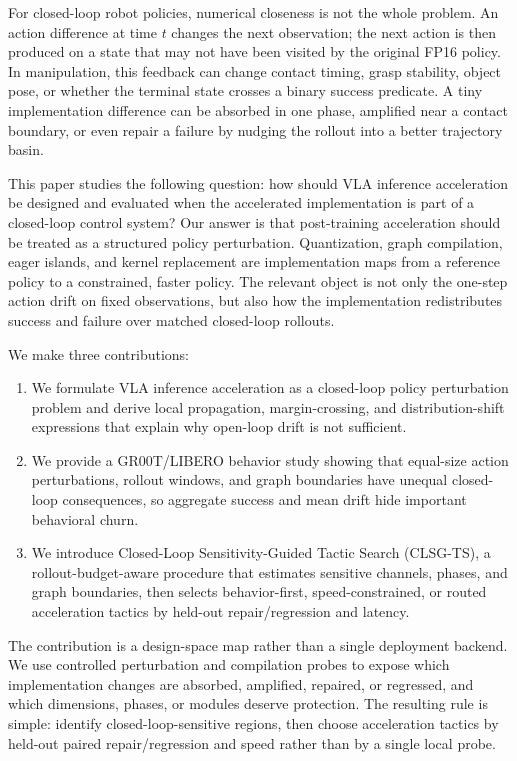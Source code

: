 \documentclass[letterpaper,10pt,twocolumn]{article}
\begin{document}
For closed-loop robot policies, numerical closeness is not the whole problem. An action difference at time $t$ changes the next observation; the next action is then produced on a state that may not have been visited by the original FP16 policy. In manipulation, this feedback can change contact timing, grasp stability, object pose, or whether the terminal state crosses a binary success predicate. A tiny implementation difference can be absorbed in one phase, amplified near a contact boundary, or even repair a failure by nudging the rollout into a better trajectory basin.

This paper studies the following question: how should VLA inference acceleration be designed and evaluated when the accelerated implementation is part of a closed-loop control system? Our answer is that post-training acceleration should be treated as a structured policy perturbation. Quantization, graph compilation, eager islands, and kernel replacement are implementation maps from a reference policy to a constrained, faster policy. The relevant object is not only the one-step action drift on fixed observations, but also how the implementation redistributes success and failure over matched closed-loop rollouts.

We make three contributions:
\begin{enumerate}
    \item We formulate VLA inference acceleration as a closed-loop policy perturbation problem and derive local propagation, margin-crossing, and distribution-shift expressions that explain why open-loop drift is not sufficient.
    \item We provide a GR00T/LIBERO behavior study showing that equal-size action perturbations, rollout windows, and graph boundaries have unequal closed-loop consequences, so aggregate success and mean drift hide important behavioral churn.
    \item We introduce Closed-Loop Sensitivity-Guided Tactic Search (CLSG-TS), a rollout-budget-aware procedure that estimates sensitive channels, phases, and graph boundaries, then selects behavior-first, speed-constrained, or routed acceleration tactics by held-out repair/regression and latency.
\end{enumerate}

The contribution is a design-space map rather than a single deployment backend. We use controlled perturbation and compilation probes to expose which implementation changes are absorbed, amplified, repaired, or regressed, and which dimensions, phases, or modules deserve protection. The resulting rule is simple: identify closed-loop-sensitive regions, then choose acceleration tactics by held-out paired repair/regression and speed rather than by a single local probe.
\end{document}
